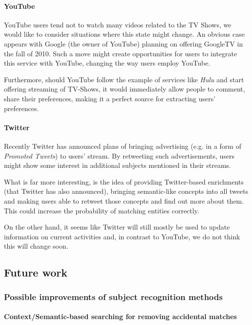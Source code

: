 \paragraph{YouTube}

YouTube users tend not to watch many videos related to the TV Shows, we would
like to consider situations where this state might change. An obvious case
appears with Google (the owner of YouTube) planning on offering GoogleTV in the
fall of 2010. Such a move might create opportunities for users to integrate
this service with YouTube, changing the way users employ YouTube.

Furthermore, should YouTube follow the example of services like \textit{Hulu}
and start offering streaming of TV-Shows, it would immediately allow people to
comment, share their preferences, making it a perfect source for extracting
users' preferences.

\paragraph{Twitter}

Recently Twitter has announced plans of bringing advertising (e.g. in a form of
\textit{Promoted Tweets}) to users' stream.  By retweeting such advertisements,
users might show some interest in additional subjects mentioned in their
streams.

What is far more interesting, is the idea of providing Twitter-based
enrichments (that Twitter has also announced), bringing semantic-like concepts
into all tweets and making users able to retweet those concepts and find out
more about them. This could increase the probability of matching entities
correctly.

On the other hand, it seems like Twitter will still mostly be used to update
information on current activities and, in contrast to YouTube, we do not think
this will change soon.

\subsection{Future work}

\subsubsection{Possible improvements of subject recognition methods}

\paragraph{Context/Semantic-based searching for removing accidental matches}

